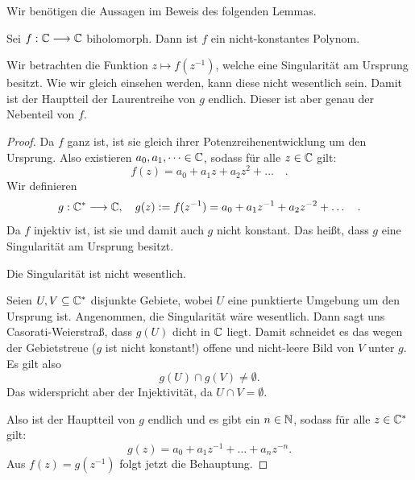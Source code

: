 Wir benötigen die Aussagen im Beweis des folgenden Lemmas.
\begin{lemma} \label{lemma_entire_biholo_polynomial}
	Sei \(f:\mathbb{C}\longrightarrow\mathbb{C}\) biholomorph. Dann ist \(f\) ein nicht-konstantes Polynom.
\end{lemma} 
\begin{idea}
	Wir betrachten die Funktion \(z\mapsto f(z^{-1})\), welche eine Singularität am Ursprung besitzt. Wie wir gleich einsehen werden, kann diese nicht wesentlich sein. Damit ist der Hauptteil der Laurentreihe von \(g\) endlich. Dieser ist aber genau der Nebenteil von \(f.\)
\end{idea}
\begin{proof}
	Da \(f\) ganz ist, ist sie gleich ihrer Potenzreihenentwicklung um den Ursprung. Also existieren \(a_0, a_1, \dots \in\mathbb{C}\), sodass für alle \(z\in\mathbb{C} \) gilt:
	\[f(z)=a_0+a_1z+a_2z^2+\dots \quad .\]
	Wir definieren
	\[g:\mathbb{C}^\ast\longrightarrow\mathbb{C}, \quad g(z):=f(z^{-1})=a_0+a_1 z^{-1} + a_2 z^{-2} + \dots \quad .\]
	Da \(f\) injektiv ist, ist sie und damit auch \(g\) nicht konstant. Das heißt, dass \(g\) eine Singularität am Ursprung besitzt.
	\begin{claim}
		Die Singularität ist nicht wesentlich.
	\end{claim}
	\begin{proofofclaim}
		Seien \(U,V\subseteq \mathbb{C}^\ast\) disjunkte Gebiete, wobei \(U\) eine punktierte Umgebung um den Ursprung ist.  Angenommen, die Singularität wäre wesentlich. 
    Dann sagt uns Casorati-Weierstraß, dass \(g(U)\) dicht in \(\mathbb{C}\) liegt. Damit schneidet es das wegen der Gebietstreue (\(g\) ist nicht konstant!) offene und nicht-leere Bild von \(V\) unter \(g.\) Es gilt also
		\[g(U)\cap g(V)\neq \emptyset.\]
		Das widerspricht aber der Injektivität, da \(U\cap V = \emptyset.\)
	\end{proofofclaim}
	Also ist der Hauptteil von \(g\) endlich und es gibt ein \(n\in \mathbb{N}\), sodass für alle \(z\in \mathbb{C}^\ast\) gilt:
	\[g(z)= a_0 + a_1 z^{-1} +\dots + a_n z^{-n}.\]
	Aus \(f(z)=g(z^{-1})\) folgt jetzt die Behauptung.
\end{proof}

